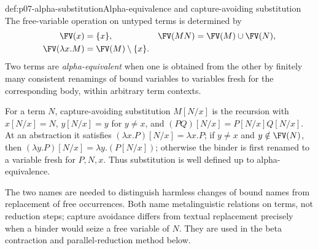 \begin{hbdefinition}{def:p07-alpha-substitution}{Alpha-equivalence and capture-avoiding substitution}
The free-variable operation on untyped terms is determined by
\[
\begin{aligned}
 \FV(x)&=\{x\},&
 \FV(MN)&=\FV(M)\cup\FV(N),\\
 \FV(\lambda x.M)&=\FV(M)\setminus\{x\}.&&
\end{aligned}
\]
Two terms are \emph{alpha-equivalent} when one is obtained from the other by
finitely many consistent renamings of bound variables to variables fresh for
the corresponding body, within arbitrary term contexts.

For a term \(N\), capture-avoiding substitution \(M[N/x]\) is the recursion
with \(x[N/x]=N\), \(y[N/x]=y\) for \(y\neq x\), and
\((PQ)[N/x]=P[N/x]Q[N/x]\).  At an abstraction it satisfies
\((\lambda x.P)[N/x]=\lambda x.P\); if \(y\neq x\) and
\(y\notin\FV(N)\), then
\((\lambda y.P)[N/x]=\lambda y.(P[N/x])\); otherwise the binder is first
renamed to a variable fresh for \(P,N,x\).  Thus substitution is well defined
up to alpha-equivalence.

The two names are needed to distinguish harmless changes of bound names from
replacement of free occurrences.  Both name metalinguistic relations on
terms, not reduction steps; capture avoidance differs from textual
replacement precisely when a binder would seize a free variable of \(N\).
They are used in the beta contraction and parallel-reduction method below.
\end{hbdefinition}

